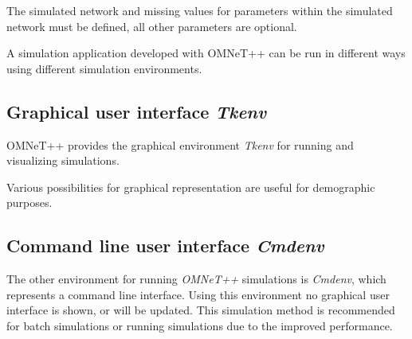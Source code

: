 The simulated network and missing values for parameters within the simulated network must be defined, all other parameters are optional.

A simulation application developed with OMNeT++ can be run in different ways using different simulation environments.

\subsection{Graphical user interface \emph{Tkenv}}
\label{sec:omnet_running_tkenv}
OMNeT++ provides the graphical environment \emph{Tkenv} for running and visualizing simulations.

Various possibilities for graphical representation are useful for demographic purposes.



\subsection{Command line user interface \emph{Cmdenv}}
\label{sec:omnet_running_cmdenv}
The other environment for running \emph{OMNeT++} simulations is \emph{Cmdenv}, which represents a command line interface.
Using this environment no graphical user interface is shown, or will be updated.
This simulation method is recommended for batch simulations or running simulations due to the improved performance.